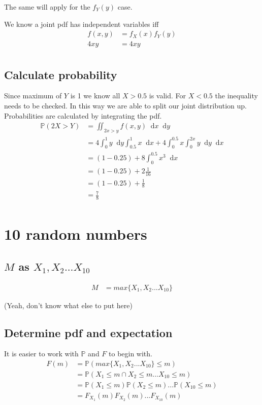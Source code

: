 \documentclass{article}
\newcommand{\diff}{\mathop{}\!\mathrm{d}}
\newcommand{\prob}{\mathbb{P}}
\begin{document}
The same will apply for the $f_Y(y)$ case.

We know a joint pdf has independent variables iff
\begin{align*}
    f(x,y) &= f_X(x)f_Y(y) \\
    4xy &= 4xy \\
\end{align*}

\subsection{Calculate probability}
Since maximum of $Y$ is 1 we know all $X>0.5$ is valid. For $X<0.5$ the
inequality needs to be checked. In this way we are able to split our joint
distribution up. Probabilities are calculated by integrating the pdf.
\begin{align*}
    \prob(2X>Y) &= \iint_{2x>y} f(x,y) \diff x \diff y \\
    &= 4 \int_0^1 y \diff y \int_{0.5}^1 x \diff x
    + 4 \int_0^{0.5} x \int_0^{2x} y \diff y \diff x \\
    &= (1 - 0.25) + 8 \int_0^{0.5} x^3 \diff x \\
    &= (1 - 0.25) + 2 \frac{1}{16} \\
    &= (1 - 0.25) + \frac{1}{8} \\
    &= \frac{7}{8} \\
\end{align*}

\section{10 random numbers}
\subsection{$M$ as $X_1, X_2 ... X_{10}$}
\begin{align*}
    M &= max\{X_1, X_2 ... X_{10}\}
\end{align*}

(Yeah, don't know what else to put here)

\subsection{Determine pdf and expectation}
It is easier to work with $\prob$ and $F$ to begin with.
\begin{align*}
    F(m) &= \prob(max\{X_1, X_2... X_{10}\} \leq m) \\
    &= \prob(X_1 \leq m \cap X_2 \leq m ... X_{10} \leq m) \\
    &= \prob(X_1 \leq m) \prob(X_2 \leq m) ... \prob(X_{10} \leq m) \\
    &= F_{X_1}(m) F_{X_2}(m) ... F_{X_{10}}(m) \\
\end{align*}
\end{document}
